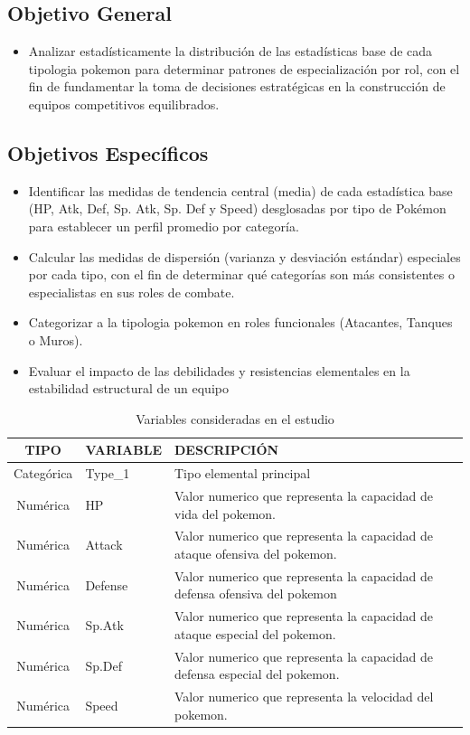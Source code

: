 \documentclass[oneside,11pt]{Latex/Classes/PhDthesisPSnPDF}
\begin{document}
\subsection{Objetivo General}
\begin{itemize}
  \item{Analizar estadísticamente la distribución de las estadísticas base de cada tipologia pokemon para determinar patrones de especialización por rol, con el fin de fundamentar la toma de decisiones estratégicas en la construcción de equipos competitivos equilibrados.}
\end{itemize}

\subsection{Objetivos Específicos}
\begin{itemize}
  \item{Identificar las medidas de tendencia central (media) de cada estadística base (HP, Atk, Def, Sp. Atk, Sp. Def y Speed) desglosadas por tipo de Pokémon para establecer un perfil promedio por categoría.}
  \item{Calcular las medidas de dispersión (varianza y desviación estándar) especiales por cada tipo, con el fin de determinar qué categorías son más consistentes o especialistas en sus roles de combate.}
  \item{Categorizar a la tipologia pokemon en roles funcionales (Atacantes, Tanques o Muros).}
  \item{Evaluar el impacto de las debilidades y resistencias elementales en la estabilidad estructural de un equipo}
\end{itemize}

\begin{table}[ht]
\centering
\caption{Variables consideradas en el estudio} 
\resizebox{12cm}{!} {
\begin{tabular}{cll}
  \hline
  \textbf{TIPO} & \textbf{VARIABLE} & \textbf{DESCRIPCIÓN} \\ 
  \hline
  Categórica & Type\_1 & Tipo elemental principal \\ 
  Numérica & HP & Valor numerico que representa la capacidad de vida del pokemon. \\ 
  Numérica & Attack  & Valor numerico que representa la capacidad de ataque ofensiva del pokemon. \\ 
  Numérica & Defense & Valor numerico que representa la capacidad de defensa ofensiva del pokemon \\ 
  Numérica & Sp.Atk & Valor numerico que representa la capacidad de ataque especial del pokemon. \\ 
  Numérica & Sp.Def & Valor numerico que representa la capacidad de defensa especial del pokemon.\\ 
  Numérica & Speed & Valor numerico que representa la velocidad del pokemon. \\ 
  
\end{tabular}
}
\end{table}
\end{document}
